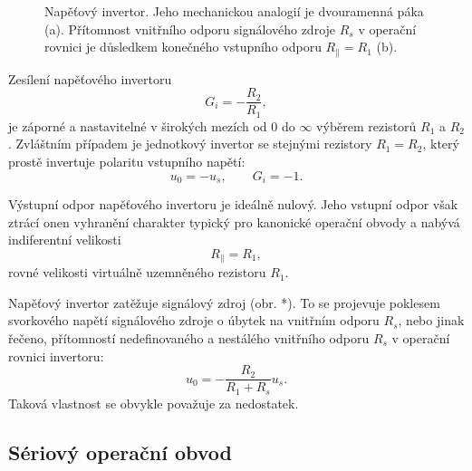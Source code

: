       \begin{figure}[ht!]
        \centering
          {}                                    \newline
          {}             
        \caption{Napěťový invertor. Jeho mechanickou analogií je dvouramenná páka (a). Přítomnost 
                 vnitřního odporu signálového zdroje $R_s$ v operační rovnici je důsledkem 
                 konečného vstupního odporu $R_{\parallel} = R_1$ (b). }
        \label{aes:fig075}
      \end{figure}
      Zesílení napěťového invertoru 
      \begin{equation}\label{AES:eq_opamp_inv01}
        G_i = -\frac{R_2}{R_1},
      \end{equation} 
      je záporné a nastavitelné v širokých mezích od $0$ do $\infty$ výběrem rezistorů $R_1$ a 
      $R_2$. Zvláštním případem je jednotkový invertor se stejnými rezistory $R_1 = R_2$, který 
      prostě invertuje polaritu vstupního napětí: $$u_0 = - u_s, \qquad G_i = -1.$$
      
      Výstupní odpor napěťového invertoru je ideálně nulový. Jeho vstupní odpor však ztrácí onen 
      vyhranění charakter typický pro kanonické operační obvody a nabývá indiferentní velikosti 
      \begin{equation}\label{AES:eq_opamp_inv03}
        R_{\parallel} = R_1,
      \end{equation} 
      rovné velikosti virtuálně uzemněného rezistoru $R_1$.
      
      Napěťový invertor zatěžuje signálový zdroj (obr. *). To se projevuje poklesem svorkového 
      napětí signálového zdroje o úbytek na vnitřním odporu $R_s$, nebo jinak řečeno, přítomností 
      nedefinovaného a nestálého vnitřního odporu $R_s$ v operační rovnici invertoru:  
      \begin{equation}\label{AES:eq_opamp_inv04}
       u_0 = -\frac{R_2}{R_1 + R_s}u_s.
      \end{equation}      
      Taková vlastnost se obvykle považuje za nedostatek. 
            
    \subsection{Sériový operační obvod}
    
